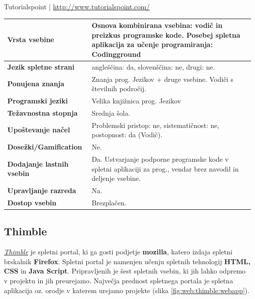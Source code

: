 \begin{osebnabox}[label={osebna:tutorails point}]{Tutorialspoint |
    \url{http://www.tutorialspoint.com/}}
    \begin{tabular}{
  p{} |
  p{}  }
  \textbf{Vrsta vsebine} & Osnova kombinirana vsebina: vodič in
                           preizkus programske kode. Posebej spletna
                           aplikacija za učenje programiranja:
                           Codingground \\
      \hline
  \textbf{Jezik spletne strani} & angleščina: da, slovenščina: ne,
                                  drugi: ne. \\
      \hline
  \textbf{Ponujena znanja} & Znanja prog. Jezikov + druge
                             vsebine. Vodiči s številnih področij. \\
      \hline
 \textbf{Programski jeziki} & Velika knjižnica prog. Jezikov \\
      \hline
  \textbf{Težavnostna stopnja} & Srednja šola.\\
      \hline
   \textbf{Upoštevanje načel} & Problemski pristop: ne,
                                sistematičnost: ne, postopnost: da (Vodič). \\
      \hline
  \textbf{Dosežki/Gamification} & Ne. \\
      \hline
  \textbf{Dodajanje lastnih vsebin} & Da. Ustvarjanje podporne
                                      programske kode v spletni
                                      aplikaciji za prog., vendar brez
                                      navodil in deljenje vsebine.  \\
      \hline
  \textbf{Upravljanje razreda} & Na. \\
      \hline
  \textbf{Dostop vsebin} & Brezplačen. \\

\end{tabular}
\end{osebnabox}

\subsection{Thimble}
\label{sec:thimble}


\emph{\href{https://thimble.mozilla.org/sl/}{Thimble}}
\cite{web:thimble} je spletni portal, ki ga gosti podjetje
\textbf{mozilla}, katero izdaja spletni brskalnik
\textbf{Firefox}. Spletni portal je namenjen učenju spletnih
tehnologij \textbf{HTML, CSS} in \textbf{Java Script}. Pripravljenih
je šest spletnih vsebin, ki jih lahko odpremo v projektu in jih
preurejamo. Največja prednost spletnega portala je spletna aplikacija
oz. orodje v katerem urejamo projekte (slika
\ref{fig:web:thimble:webapp}).

